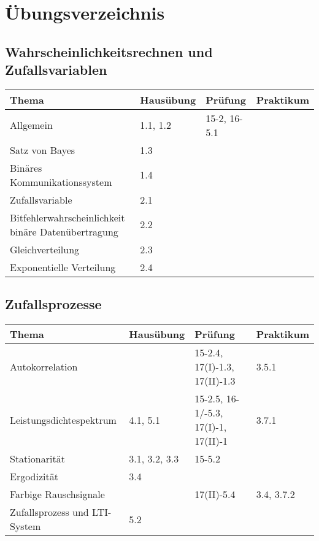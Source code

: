 \section{Übungsverzeichnis}

\subsection{Wahrscheinlichkeitsrechnen und Zufallsvariablen}
	\begin{tabular}{|p{9cm}|p{2.5cm}|p{3.9cm}|p{1.6cm}|}
	\hline
	\textbf{Thema} & \textbf{Hausübung} & \textbf{Prüfung} & \textbf{Praktikum} \\ 
	\hline
	\hline
	Allgemein & 1.1, 1.2 & 15-2, 16-5.1& \\
	\hline
	Satz von Bayes & 1.3 & & \\
	\hline
	Binäres Kommunikationssystem & 1.4 & & \\
	\hline
	Zufallsvariable	& 2.1 & &  \\
	\hline
	Bitfehlerwahrscheinlichkeit binäre Datenübertragung & 2.2 & & \\
	\hline
	Gleichverteilung & 2.3 & & \\
	\hline
	Exponentielle Verteilung & 2.4 & & \\
	\hline
	\end{tabular}
\subsection{Zufallsprozesse}
	\begin{tabular}{|p{9cm}|p{2.5cm}|p{3.9cm}|p{1.6cm}|}
	\hline
	\textbf{Thema} & \textbf{Hausübung} & \textbf{Prüfung} & \textbf{Praktikum} \\ 
	\hline
	Autokorrelation	& & 15-2.4, 17(I)-1.3, 17(II)-1.3& 3.5.1 \\
	\hline
	Leistungsdichtespektrum & 4.1, 5.1 & 15-2.5, 16-1/-5.3, 17(I)-1, 17(II)-1& 3.7.1 \\
	\hline
	Stationarität & 3.1, 3.2, 3.3 & 15-5.2 & \\
	\hline
	Ergodizität	 & 3.4 & & \\
	\hline
	Farbige Rauschsignale & & 17(II)-5.4& 3.4, 3.7.2\\
	\hline
	Zufallsprozess und LTI-System & 5.2 & & \\
	\hline
	\end{tabular}
